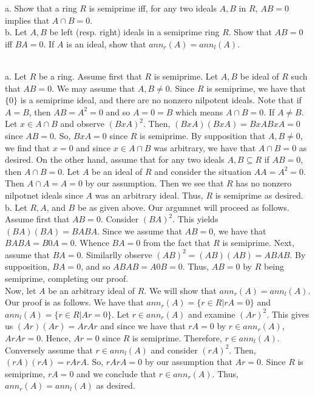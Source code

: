 a. Show that a ring $R$ is semiprime iff, for any two ideals $A,B$ in $R$, $AB=0$ implies that 
$A\cap B=0$.\\
b. Let $A,B$ be left (resp. right) ideals in a semiprime ring $R$. Show that $AB=0$ iff $BA=0$. If $A$
is an ideal, show that $ann_r(A)=ann_l(A)$.\\

\begin{solution}\renewcommand{\qedsymbol}{}\ \\
    a. Let $R$ be a ring. Assume first that $R$ is semiprime. Let $A,B$ be ideal of $R$ such that
    $AB=0$. We may assume that $A,B\neq0$. Since $R$ is semiprime, we have that $\{0\}$ is a semiprime
    ideal, and there are no nonzero nilpotent ideals. Note that if $A=B$, then $AB=A^2=0$ and so $A=0=B$
    which means $A\cap B=0$. If $A\neq B$. Let $x\in A\cap B$ and observe $(BxA)^2$. Then,
    $(BxA)(BxA)=BxABxA=0$ since $AB=0$. So, $BxA=0$ since $R$ is semiprime. By supposition that
    $A,B\neq0$, we find that $x=0$ and since $x\in A\cap B$ was arbitrary, we have that $A\cap B=0$ as
    desired. On the other hand, assume that for any two ideals $A,B\subseteq R$ if $AB=0$, then
    $A\cap B=0$. Let $A$ be an ideal of $R$ and consider the situation $AA=A^2=0$. Then $A\cap A=A=0$ by
    our assumption. Then we see that $R$ has no nonzero nilpotnet ideals since $A$ was an arbitrary
    ideal. Thus, $R$ is semiprime as desired.\\

    b. Let $R, A$, and $B$ be as given above. Our argumnet will proceed as follows. Assume first that
    $AB=0$. Consider $(BA)^2$. This yields $(BA)(BA)=BABA$. Since we assume that $AB=0$, we have that
    $BABA=B0A=0$. Whence $BA=0$ from the fact that $R$ is semiprime. Next, assume that $BA=0$.
    Similarlly observe $(AB)^2=(AB)(AB)=ABAB$. By supposition, $BA=0$, and so $ABAB=A0B=0$. Thus, $AB=0$
    by $R$ being semiprime, completing our proof.\\
    
    Now, let $A$ be an arbitrary ideal of $R$. We will show that $ann_r(A)=ann_l(A)$. Our proof is as
    follows. We have that $ann_r(A)=\{r\in R|rA=0\}$ and $ann_l(A)=\{r\in R|Ar=0\}$. Let $r\in ann_r(A)$
    and examine $(Ar)^2$. This gives us $(Ar)(Ar)=ArAr$ and since we have that $rA=0$ by
    $r\in ann_r(A)$, $ArAr=0$. Hence, $Ar=0$ since $R$ is semiprime. Therefore, $r\in ann_l(A)$.
    Conversely assume that $r\in ann_l(A)$ and consider $(rA)^2$. Then, $(rA)(rA)=rArA$. So, $rArA=0$ by
    our assumption that $Ar=0$. Since $R$ is semiprime, $rA=0$ and we conclude that $r\in ann_r(A)$.
    Thus, $ann_r(A)=ann_l(A)$ as desired.

\end{solution}